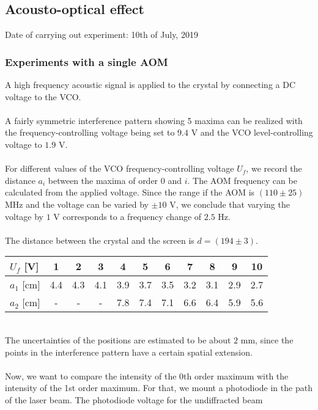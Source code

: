 \newpage
\subsection{Acousto-optical effect}
Date of carrying out experiment: 10th of July, 2019

\subsubsection{Experiments with a single AOM}
A high frequency acoustic signal is applied to the crystal by connecting
a DC voltage to the VCO. \\ \\
A fairly symmetric interference pattern showing 5 maxima can be realized
with the frequency-controlling voltage being set to
$9.4$ V and the VCO level-controlling voltage to $1.9$ V. \\ \\
For different values of the VCO frequency-controlling voltage $U_f$,
we record the distance $a_i$ between the maxima of order $0$ and $i$.
The AOM frequency can be calculated from the applied voltage. Since the
range if the AOM is $(110\pm25)$ MHz\cite{F85} and the voltage can be
varied by $\pm10$ V, we conclude that varying the voltage by $1$ V
corresponds to a frequency change of $2.5$ Hz. \\ \\
The distance between the crystal and the screen is $d=(194\pm3)$. \\
\begin{center}
    \begin{tabular}{l|cccccccccc}
        $U_f$ [V] & 1 & 2 & 3 & 4 & 5 &
        6 & 7 & 8 & 9 & 10 \\
        \hline
        $a_1$ [cm] & 4.4 & 4.3 & 4.1 & 3.9 &
        3.7 & 3.5 & 3.2 & 3.1 & 2.9 & 2.7 \\
        $a_2$ [cm] & - & - & - & 7.8 & 7.4 & 7.1 & 6.6 & 6.4 & 5.9 & 5.6
    \end{tabular}
\end{center} \null \ \\
The uncertainties of the positions
are estimated to be about $2$ mm, since the points
in the interference pattern have a certain spatial extension. \\ \\
Now, we want to compare the intensity of the 0th order maximum with the
intensity of the 1st order maximum. For that, we mount a photodiode in
the path of the laser beam. The photodiode voltage for the undiffracted beam 
